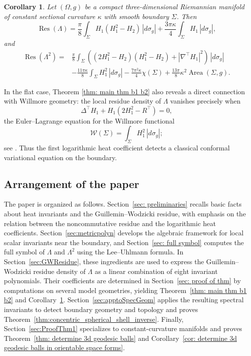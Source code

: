 \documentclass[11pt]{amsart}
\newcommand*{\Res}{\operatorname{Res}}
\newcommand{\Area}{\operatorname{Area}}
\newtheorem{corollary}[theorem]{Corollary}
\theoremstyle{definition}
\numberwithin{equation}{section}
\begin{document}
	\begin{corollary}
		\label{cor: b_1 b_2 constant curvature}
		Let $(\Omega,g)$ be a compact three-dimensional Riemannian manifold of constant sectional curvature $\kappa$ with smooth boundary $\Sigma$.  Then
		\begin{equation}
			\label{eq: b1}
			\Res(\Lambda) = \frac{\pi}{8}\int_\Sigma H_1(H_1^2-H_2)\,|d\sigma_g|
			+\frac{3\pi\kappa}{4}\int_\Sigma H_1\,|d\sigma_g|,
		\end{equation}
		and
		\begin{equation}
			\label{eq: b2}
			\begin{aligned}
				\Res(\Lambda^2)={}&
				\frac{\pi}{8}\int_\Sigma
				\left((2H_1^2-H_2)(H_1^2-H_2) + |\nabla^\top H_1|^2\right)\,|d\sigma_g|\\
				&
				-\frac{11\pi\kappa}{8}\int_\Sigma H_1^2\,|d\sigma_g|
				-\frac{7\pi^2\kappa}{4}\chi(\Sigma)
				+\frac{13\pi}{8}\kappa^2\Area(\Sigma,g).
			\end{aligned}
		\end{equation}
	\end{corollary}
	
	 
	 
	In the flat case, Theorem \ref{thm: main thm b1 b2} also reveals a direct connection with Willmore geometry: the local residue density of $\Lambda$ vanishes precisely when
	\[
	\Delta^\top H_1+H_1(2H_1^2-R^\top)=0,
	\]
	the Euler--Lagrange equation for the Willmore functional
	\[
	\mathcal W(\Sigma)=\int_\Sigma H_1^2\,|d\sigma_g|;
	\]
	see \cite{riviere2008analysis}.  Thus the first logarithmic heat coefficient detects a classical conformal variational equation on the boundary.
	
	\subsection{Arrangement of the paper}
	
	The paper is organized as follows. Section~\ref{sec: preliminaries} recalls basic facts about heat invariants and the Guillemin--Wodzicki residue, with emphasis on the relation between the noncommutative residue and the logarithmic heat coefficients. Section~\ref{sec:metricpolyn} develops the algebraic framework for local scalar invariants near the boundary, and Section~\ref{sec: full symbol}  computes the full symbol of $\Lambda$ and $\Lambda^2$ using the Lee--Uhlmann formula. In Section~\ref{sec:GWResidue}, these ingredients are used to express the Guillemin--Wodzicki residue density of $\Lambda$ as a linear combination of eight invariant polynomials. Their coefficients are determined in Section~\ref{sec: proof of thm} by computations on several model geometries, yielding Theorem~\ref{thm: main thm b1 b2} and Corollary~\ref{cor: b_1 b_2 constant curvature}. Section~\ref{sec:apptoSpecGeom} applies the resulting spectral invariants to detect boundary geometry and topology and proves Theorem~\ref{thm:concentric_spherical_shell_inverse}. Finally, Section~\ref{sec:ProofThm1} specializes to constant-curvature manifolds and proves Theorem~\ref{thm: determine 3d geodesic balls} and Corollary~\ref{cor: determine 3d geodesic balls in orientable space forms}.
	 
\end{document}
